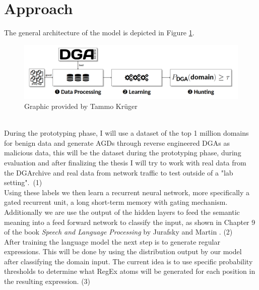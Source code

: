 \documentclass[a4paper, 12pt]{article}
\begin{document}
\section{Approach}
The general architecture of the model is depicted in Figure \ref{fig:architecture}. 
\begin{figure}[h]
    \includegraphics[width=\textwidth]{images/DGA_Detect_Architecture.png}
    \caption{Graphic provided by Tammo Kr\"uger}
    \label{fig:architecture}
\end{figure}\\
During the prototyping phase, I will use a dataset of the top 1 million domains
\cite{noauthor_cisco_nodate} for benign data and
generate AGDs through reverse engineered DGAs \cite{bader_baderjdomain_generation_algorithms_2024}
as malicious data, this will be the dataset during the prototyping phase, during evaluation and
after finalizing the thesis I will try to work with real data from the DGArchive and real data from
network traffic to test outside of a "lab setting".~(1)\\
Using these labels we then learn a recurrent neural network, more specifically a gated recurrent
unit, a long short-term memory with gating mechanism. Additionally we are use the output of the
hidden layers to feed the semantic meaning into a feed forward network to classify the input, as
shown in Chapter 9 of the book \textit{Speech and Language Processing} by Jurafsky and Martin
\cite{jurafsky_speech_2024}. (2)\\
After training the language model the next step is to generate regular expressions. This will be
done by using the distribution output by our model after classifying the domain input. The current
idea is to use specific probability thresholds to determine what RegEx atoms will be generated for
each position in the resulting expression. (3)
\end{document}
